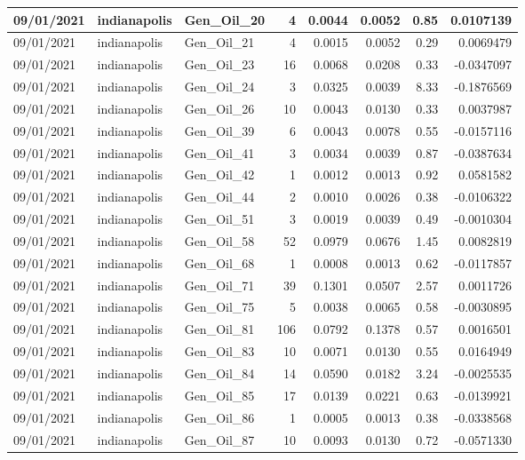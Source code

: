\documentclass[
  letterpaper,
  DIV=11,
  numbers=noendperiod]{scrartcl}
\begin{document}
\begin{tabular}{l|l|l|r|r|r|r|r}
\hline
09/01/2021 & indianapolis & Gen\_Oil\_20 & 4 & 0.0044 & 0.0052 & 0.85 & 0.0107139\\
\hline
09/01/2021 & indianapolis & Gen\_Oil\_21 & 4 & 0.0015 & 0.0052 & 0.29 & 0.0069479\\
\hline
09/01/2021 & indianapolis & Gen\_Oil\_23 & 16 & 0.0068 & 0.0208 & 0.33 & -0.0347097\\
\hline
09/01/2021 & indianapolis & Gen\_Oil\_24 & 3 & 0.0325 & 0.0039 & 8.33 & -0.1876569\\
\hline
09/01/2021 & indianapolis & Gen\_Oil\_26 & 10 & 0.0043 & 0.0130 & 0.33 & 0.0037987\\
\hline
09/01/2021 & indianapolis & Gen\_Oil\_39 & 6 & 0.0043 & 0.0078 & 0.55 & -0.0157116\\
\hline
09/01/2021 & indianapolis & Gen\_Oil\_41 & 3 & 0.0034 & 0.0039 & 0.87 & -0.0387634\\
\hline
09/01/2021 & indianapolis & Gen\_Oil\_42 & 1 & 0.0012 & 0.0013 & 0.92 & 0.0581582\\
\hline
09/01/2021 & indianapolis & Gen\_Oil\_44 & 2 & 0.0010 & 0.0026 & 0.38 & -0.0106322\\
\hline
09/01/2021 & indianapolis & Gen\_Oil\_51 & 3 & 0.0019 & 0.0039 & 0.49 & -0.0010304\\
\hline
09/01/2021 & indianapolis & Gen\_Oil\_58 & 52 & 0.0979 & 0.0676 & 1.45 & 0.0082819\\
\hline
09/01/2021 & indianapolis & Gen\_Oil\_68 & 1 & 0.0008 & 0.0013 & 0.62 & -0.0117857\\
\hline
09/01/2021 & indianapolis & Gen\_Oil\_71 & 39 & 0.1301 & 0.0507 & 2.57 & 0.0011726\\
\hline
09/01/2021 & indianapolis & Gen\_Oil\_75 & 5 & 0.0038 & 0.0065 & 0.58 & -0.0030895\\
\hline
09/01/2021 & indianapolis & Gen\_Oil\_81 & 106 & 0.0792 & 0.1378 & 0.57 & 0.0016501\\
\hline
09/01/2021 & indianapolis & Gen\_Oil\_83 & 10 & 0.0071 & 0.0130 & 0.55 & 0.0164949\\
\hline
09/01/2021 & indianapolis & Gen\_Oil\_84 & 14 & 0.0590 & 0.0182 & 3.24 & -0.0025535\\
\hline
09/01/2021 & indianapolis & Gen\_Oil\_85 & 17 & 0.0139 & 0.0221 & 0.63 & -0.0139921\\
\hline
09/01/2021 & indianapolis & Gen\_Oil\_86 & 1 & 0.0005 & 0.0013 & 0.38 & -0.0338568\\
\hline
09/01/2021 & indianapolis & Gen\_Oil\_87 & 10 & 0.0093 & 0.0130 & 0.72 & -0.0571330\\

\end{tabular}
\end{document}
